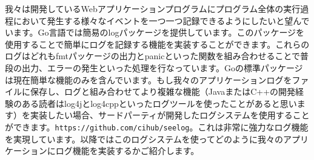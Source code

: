 我々は開発しているWebアプリケーションプログラムにプログラム全体の実行過程において発生する様々なイベントを一つ一つ記録できるようにしたいと望んでいます。Go言語では簡易のlogパッケージを提供しています。このパッケージを使用することで簡単にログを記録する機能を実装することができます。これらのログはどれもfmtパッケージの出力とpanicといった関数を組み合わせることで普段の出力、エラーの発生といった処理を行なっています。Goの標準パッケージは現在簡単な機能のみを含んでいます。もし我々のアプリケーションログをファイルに保存し、ログと組み合わせてより複雑な機能（JavaまたはC++の開発経験のある読者はlog4jとlog4cppといったログツールを使ったことがあると思います）を実装したい場合、サードパーティが開発したログシステムを使用することができます。\texttt{https://github.com/cihub/seelog}。これは非常に強力なログ機能を実現しています。以降ではこのログシステムを使ってどのように我々のアプリケーションにログ機能を実装するかご紹介します。
